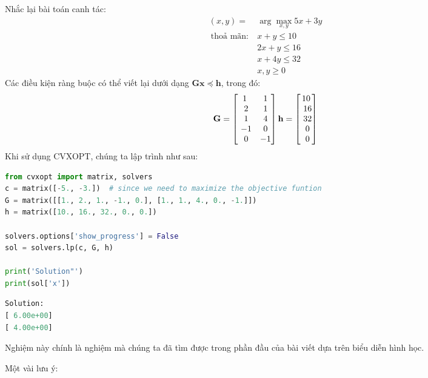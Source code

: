 Nhắc lại bài toán canh tác:
\begin{equation}
\label{eqn:17_canhtac2}
\begin{aligned}
(x, y) =& \arg\max_{x, y} 5x + 3y \\\
\text{thoả mãn:}~ & x + y \leq 10 \\\
& 2x + y \leq 16  \\\
& x + 4y \leq 32 \\\
& x, y \geq 0
\end{aligned}
\end{equation}
Các điều kiện ràng buộc có thể viết lại dưới dạng $ \mathbf{Gx} \preceq
\mathbf{h}$, trong đó:
\begin{equation*}
\mathbf{G} =
\left[\begin{matrix}
1 & 1 \\\
2 & 1 \\\
1 & 4 \\\
-1 & 0 \\\
0 & -1
\end{matrix}\right]
\mathbf{h} =
\left[\begin{matrix}
10\\\
16 \\\
32 \\\
0 \\\
0
\end{matrix}\right]
\end{equation*}
Khi sử dụng CVXOPT, chúng ta lập trình
như sau:
\begin{lstlisting}[language=Python]
from cvxopt import matrix, solvers
c = matrix([-5., -3.])  # since we need to maximize the objective funtion
G = matrix([[1., 2., 1., -1., 0.], [1., 1., 4., 0., -1.]])
h = matrix([10., 16., 32., 0., 0.])

solvers.options['show_progress'] = False
sol = solvers.lp(c, G, h)

print('Solution"')
print(sol['x'])
\end{lstlisting}
\kq
\begin{lstlisting}[language=Python]
Solution:
[ 6.00e+00]
[ 4.00e+00]
\end{lstlisting}
Nghiệm này chính là nghiệm mà chúng ta đã tìm được trong phần đầu của bài viết
dựa trên biểu diễn hình học.

Một vài lưu ý:

